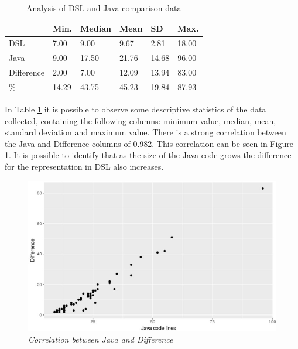 \begin{table}[htb!]
\centering
\caption{Analysis of DSL and Java comparison data}
\label{table:analiseComparacao}
\begin{center}
\begin{tabular}{|l|l|l|l|l|l|}
\hline
           & \textbf{Min.}  & \textbf{Median} & \textbf{Mean}  & \textbf{SD}    & \textbf{Max.}  \\ \hline
DSL        & 7.00  & 9.00   & 9.67  & 2.81  & 18.00 \\ \hline
Java       & 9.00  & 17.50  & 21.76 & 14.68 & 96.00 \\ \hline
Difference & 2.00  & 7.00   & 12.09 & 13.94 & 83.00 \\ \hline
\%         & 14.29 & 43.75  & 45.23 & 19.84 & 87.93 \\ \hline
\end{tabular}
\end{center}
\end{table}


In Table \ref{table:analiseComparacao} it is possible to observe some descriptive statistics of the data collected, containing the following columns: minimum value, median, mean, standard deviation and maximum value. There is a strong correlation between the Java and Difference columns of 0.982. This correlation can be seen in Figure \ref{fig:correlacao}. It is possible to identify that as the size of the Java code grows the difference for the representation in DSL also increases.

\begin{figure}[htb!] 
\centering
  \includegraphics[width=.45\textwidth]
  {img/artigo_correlacao.jpg}
  \caption{\it Correlation between Java and Difference}
  \label{fig:correlacao}
\end{figure}

